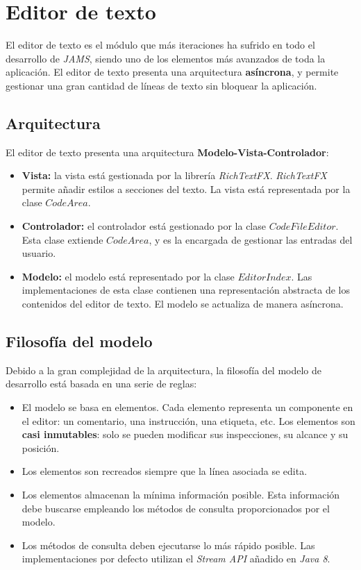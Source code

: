 \section{Editor de texto}\label{sec:editor-de-texto}

El editor de texto es el módulo que más iteraciones
ha sufrido en todo el desarrollo de \textit{JAMS},
siendo uno de los elementos más avanzados de toda
la aplicación.
El editor de texto presenta una arquitectura
\textbf{asíncrona}, y permite gestionar una gran
cantidad de líneas de texto sin bloquear la aplicación.

\subsection{Arquitectura}\label{subsec:arquitectura}

El editor de texto presenta una arquitectura
\textbf{Modelo-Vista-Controlador}:
\begin{itemize}
    \item \textbf{Vista:} la vista está gestionada
    por la librería \textit{RichTextFX}\cite{RICH_TEXT_FX}.
    \textit{RichTextFX} permite añadir estilos
    a secciones del texto.
    La vista está representada por la clase
    $CodeArea$.
    \item \textbf{Controlador:} el controlador está
    gestionado por la clase $CodeFileEditor$.
    Esta clase extiende $CodeArea$, y es la
    encargada de gestionar las entradas del usuario.
    \item \textbf{Modelo:} el modelo está representado
    por la clase $EditorIndex$.
    Las implementaciones de esta clase contienen
    una representación abstracta de los contenidos
    del editor de texto.
    El modelo se actualiza de manera asíncrona.
\end{itemize}

\subsection{Filosofía del modelo}\label{subsec:filosofía-del-modelo}


Debido a la gran complejidad de la arquitectura,
la filosofía del modelo de desarrollo está basada en una serie de reglas:
\begin{itemize}
    \item El modelo se basa en elementos.
    Cada elemento representa un componente en el editor:
    un comentario, una instrucción, una etiqueta, etc.
    Los elementos son \textbf{casi inmutables}:
    solo se pueden modificar sus inspecciones, su alcance y su posición.
    \item Los elementos son recreados siempre que la línea asociada se edita.
    \item Los elementos almacenan la mínima información posible.
    Esta información debe buscarse empleando los métodos
    de consulta proporcionados por el modelo.
    \item Los métodos de consulta deben ejecutarse lo más rápido
    posible.
    Las implementaciones por defecto utilizan el
    \textit{Stream API}\cite{STREAM_API} añadido en \textit{Java 8}.
\end{itemize}

